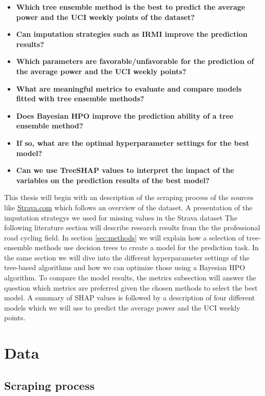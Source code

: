 \documentclass[12pt,a4paper]{article}
\begin{document}
\begin{itemize}
\item \textbf{Which tree ensemble method is the best to predict the average power and the UCI weekly points of the dataset?}
\item \textbf{Can imputation strategies such as IRMI improve the prediction results?}
\item \textbf{Which parameters are favorable/unfavorable for the prediction of the average power and  the UCI weekly points?} 
\item \textbf{What are meaningful metrics to evaluate and compare models fitted with tree ensemble methods?} 
\item \textbf{Does Bayesian HPO improve the prediction ability of a tree ensemble method?}
\item \textbf{If so, what are the optimal hyperparameter settings for the best model?}
\item \textbf{Can we use TreeSHAP values to interpret the impact of the variables on the prediction results of the best model?}
\end{itemize}

This thesis will begin with an description of the scraping process of the sources like \href{Strava.com}{Strava.com} which follows an overview of the dataset. A presentation of the imputation strategys we used for missing values in the Strava dataset The following literature section will describe research results from the the professional road cycling field. In section \ref{sec:methods} we will explain how a selection of tree-ensemble methods use decision trees to create a model for the prediction task. In the same section we will dive into the different hyperparameter settings of the tree-based algorithms and how we can optimize those using a Bayesian HPO algorithm. To compare the model results, the metrics subsection will answer the question which metrics are preferred given the chosen methods to select the best model. A summary of SHAP values is followed by a description of four different models which we will use to predict the average power and the UCI weekly points.

\hypertarget{data}{%
\section{Data}\label{data}}

\hypertarget{scraping-process}{%
\subsection{Scraping process}\label{scraping-process}}
\end{document}
